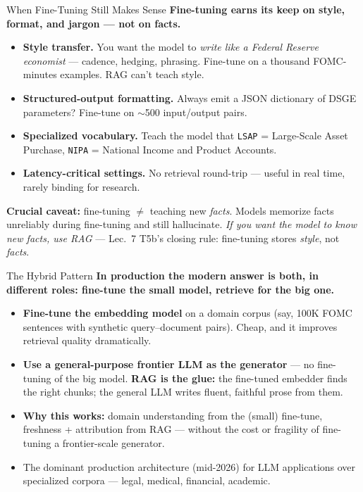 \begin{frame}{When Fine-Tuning Still Makes Sense}
\textbf{Fine-tuning earns its keep on style, format, and jargon --- not on facts.}

\medskip
\begin{itemize}
\item \textbf{Style transfer.} You want the model to \emph{write like a Federal Reserve economist} --- cadence, hedging, phrasing. Fine-tune on a thousand FOMC-minutes examples. RAG can't teach style.

\medskip
\item \textbf{Structured-output formatting.} Always emit a JSON dictionary of DSGE parameters? Fine-tune on $\sim$500 input/output pairs.

\medskip
\item \textbf{Specialized vocabulary.} Teach the model that \texttt{LSAP} = Large-Scale Asset Purchase, \texttt{NIPA} = National Income and Product Accounts.

\medskip
\item \textbf{Latency-critical settings.} No retrieval round-trip --- useful in real time, rarely binding for research.
\end{itemize}

\medskip
\begin{cautionbox}
\textbf{Crucial caveat:} fine-tuning $\neq$ teaching new \emph{facts}. Models memorize facts unreliably during fine-tuning and still hallucinate. \emph{If you want the model to know new facts, use RAG} --- Lec.\ 7 T5b's closing rule: fine-tuning stores \emph{style}, not \emph{facts}.
\end{cautionbox}
\end{frame}

\begin{frame}{The Hybrid Pattern}
\textbf{In production the modern answer is both, in different roles: fine-tune the small model, retrieve for the big one.}

\smallskip
\begin{itemize}
\item \textbf{Fine-tune the embedding model} on a domain corpus (say, 100K FOMC sentences with synthetic query--document pairs). Cheap, and it improves retrieval quality dramatically.

\smallskip
\item \textbf{Use a general-purpose frontier LLM as the generator} --- no fine-tuning of the big model. \textbf{RAG is the glue:} the fine-tuned embedder finds the right chunks; the general LLM writes fluent, faithful prose from them.

\smallskip
\item \textbf{Why this works:} domain understanding from the (small) fine-tune, freshness + attribution from RAG --- without the cost or fragility of fine-tuning a frontier-scale generator.

\smallskip
\item The dominant production architecture (mid-2026) for LLM applications over specialized corpora --- legal, medical, financial, academic.
\end{itemize}
\end{frame}

